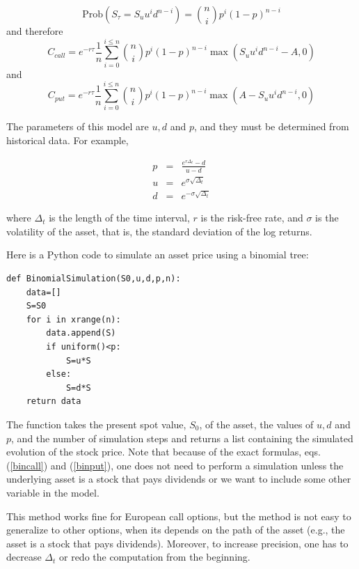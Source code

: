 \documentclass[justified,sixbynine]{tufte-book}
\theoremstyle{plain}%
\theoremstyle{definition}
\theoremstyle{remark}
\begin{document}
\begin{fullwidth}
\begin{equation}
\textrm{Prob}(S_\tau =S_uu^id^{n-i})=\binom nip^i(1-p)^{n-i}
\end{equation}
and therefore
\begin{equation}
C_{call}=e^{-r\tau }\frac 1n\sum_{i=0}^{i\leq n}\binom nip^i(1-p)^{n-i}\max
(S_uu^id^{n-i}-A,0)  \label{bincall}
\end{equation}
and
\begin{equation}
C_{put}=e^{-r\tau }\frac 1n\sum_{i=0}^{i\leq n}\binom nip^i(1-p)^{n-i}\max
(A-S_uu^id^{n-i},0)  \label{binput}
\end{equation}

The parameters of this model are $u,d$ and $p$, and they must be determined
from historical data. For example,

\begin{eqnarray}
p &=& \frac{e^{r\Delta_t} - d}{u-d} \\
u &=& e^{\sigma\sqrt{\Delta_t}} \\
d &=& e^{-\sigma\sqrt{\Delta_t}}
\end{eqnarray}

where $\Delta_t$ is the length of the time interval, $r$ is the risk-free rate, and $\sigma$ is the volatility of the asset, that is, the standard deviation of the log returns.

Here is a Python code to simulate an asset price using a binomial tree:
\begin{lstlisting}
def BinomialSimulation(S0,u,d,p,n):
    data=[]
    S=S0
    for i in xrange(n):
        data.append(S)
        if uniform()<p:
            S=u*S
        else:
            S=d*S
    return data
\end{lstlisting}

The function takes the present spot value, $S_0$, of the asset, the values
of $u,d$ and $p$, and the number of simulation steps and returns a list
containing the simulated evolution of the stock price. Note that because of
the exact formulas, eqs.(\ref{bincall}) and (\ref{binput}), one does not need
to perform a simulation unless the underlying asset is a stock that pays
dividends or we want to include some other variable in the model.

This method works fine for European call options, but the method is not easy to
generalize to other options, when its depends on the path of
the asset (e.g., the asset is a stock that pays dividends). Moreover,
to increase precision, one has to decrease $\Delta _t$ or redo the
computation from the beginning.


\end{fullwidth}
\end{document}
